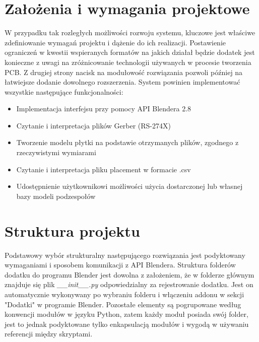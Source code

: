 \documentclass[brudnopis]{xmgr}
\begin{document}
\section{Założenia i wymagania projektowe}
W przypadku tak rozległych możliwości rozwoju systemu, kluczowe jest właściwe zdefiniowanie wymagań projektu i dążenie do ich realizacji. Postawienie ograniczeń w kwestii wspieranych formatów na jakich działał będzie dodatek jest konieczne z uwagi na zróżnicowanie technologii używanych w procesie tworzenia PCB. Z drugiej strony nacisk na modułowość rozwiązania pozwoli później na łatwiejsze dodanie dowolnego rozszerzenia.
System powinien implementować wszystkie następujące funkcjonalności:

\begin{itemize}

\item Implementacja interfejsu przy pomocy API Blendera 2.8

\item Czytanie i interpretacja plików Gerber (RS-274X)

\item Tworzenie modelu płytki na podstawie otrzymanych plików, zgodnego z rzeczywistymi wymiarami

\item Czytanie i interpretacja pliku placement w formacie .csv

\item Udostępnienie użytkownikowi możliwości użycia dostarczonej lub własnej bazy modeli podzespołów

\end{itemize}

\section {Struktura projektu}
Podstawowy wybór strukturalny następującego rozwiązania jest podyktowany wymaganiami i sposobem komunikacji z API Blendera. Struktura folderów dodatku do programu Blender jest dowolna z założeniem, że w folderze głównym znajduje się plik \emph{\_\_init\_\_.py} odpowiedzialny za rejestrowanie dodatku. Jest on automatycznie wykonywany po wybraniu folderu i włączeniu addonu w sekcji "Dodatki" w programie Blender. Pozostałe elementy są pogrupowane według konwencji modułów w języku Python, zatem każdy moduł posiada swój folder, jest to jednak podyktowane tylko enkapsulacją modułów i wygodą w używaniu referencji między skryptami.
\end{document}
